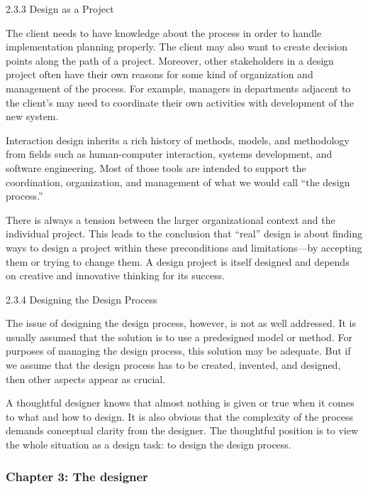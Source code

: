 2.3.3 Design as a Project

The client needs to have knowledge about the process in order to handle implementation planning properly. The client may also want to create decision points along the path of a project. Moreover, other stakeholders in a design project often have their own reasons for some kind of organization and management of the process. For example, managers in departments adjacent to the client’s may need to coordinate their own activities with development of the new system.

Interaction design inherits a rich history of methods, models, and methodology from fields such as human-computer interaction, systems development, and software engineering. Most of those tools are intended to support the coordination, organization, and management of what we would call “the design process.”

There is always a tension between the larger organizational context and the individual project.
This leads to the conclusion that “real” design is about finding ways to design a project within these preconditions and limitations—by accepting them or trying to change them. A design project is itself designed and depends on creative and innovative thinking for its success.

2.3.4 Designing the Design Process

The issue of designing the design process, however, is not as well addressed. It is usually assumed that the solution is to use a predesigned model or method. For purposes of managing the design process, this solution may be adequate. But if we assume that the design process has to be created, invented, and designed, then other aspects appear as crucial.


A thoughtful designer knows that almost nothing is given or true when it comes to what and how to design. It is also obvious that the complexity of the process demands conceptual clarity from the designer. The thoughtful position is to view the whole situation as a design task: to design the design process.

\subsubsection{Chapter 3: The designer}

